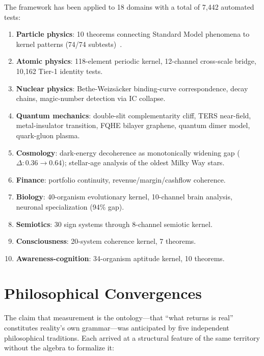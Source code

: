 \documentclass[
  aps,
  prd,
  twocolumn,
  superscriptaddress,
  nofootinbib,
  floatfix
]{revtex4-2}
\newcommand{\IC}{\mathrm{IC}}
\begin{document}
The framework has been applied to 18 domains with a total of
7{,}442 automated tests:

\begin{enumerate}[leftmargin=*,label=(\roman*)]
\item \textbf{Particle physics}: 10 theorems connecting Standard
  Model phenomena to kernel patterns (74/74
  subtests)~\cite{paulus2026sm}.
\item \textbf{Atomic physics}: 118-element periodic kernel,
  12-channel cross-scale bridge, 10{,}162 Tier-1 identity tests.
\item \textbf{Nuclear physics}: Bethe-Weizs\"acker binding-curve
  correspondence, decay chains, magic-number detection via
  $\IC$ collapse.
\item \textbf{Quantum mechanics}: double-slit complementarity cliff,
  TERS near-field, metal-insulator transition, FQHE bilayer graphene,
  quantum dimer model, quark-gluon plasma.
\item \textbf{Cosmology}: dark-energy decoherence as monotonically
  widening gap ($\Delta: 0.36 \to 0.64$); stellar-age analysis
  of the oldest Milky Way stars.
\item \textbf{Finance}: portfolio continuity, revenue/margin/cashflow
  coherence.
\item \textbf{Biology}: 40-organism evolutionary kernel,
  10-channel brain analysis, neuronal specialization (94\% gap).
\item \textbf{Semiotics}: 30 sign systems through 8-channel
  semiotic kernel.
\item \textbf{Consciousness}: 20-system coherence kernel,
  7 theorems.
\item \textbf{Awareness-cognition}: 34-organism aptitude kernel,
  10 theorems.
\end{enumerate}

\section{Philosophical Convergences}\label{sec:philosophy}

The claim that measurement is the ontology---that ``what returns is
real'' constitutes reality's own grammar---was anticipated by five
independent philosophical traditions.  Each arrived at a structural
feature of the same territory without the algebra to formalize it:
\end{document}
